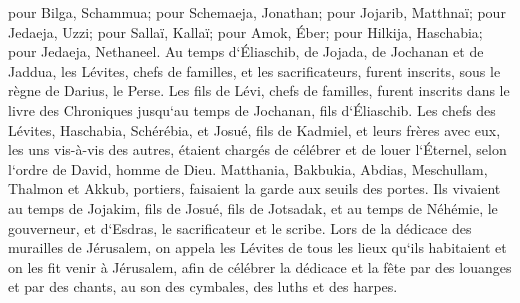 \verse pour Bilga, Schammua; pour Schemaeja, Jonathan; 
\verse pour Jojarib, Matthnaï; pour Jedaeja, Uzzi; 
\verse pour Sallaï, Kallaï; pour Amok, Éber; 
\verse pour Hilkija, Haschabia; pour Jedaeja, Nethaneel. 
\verse Au temps d`Éliaschib, de Jojada, de Jochanan et de Jaddua, les Lévites, chefs de familles, et les sacrificateurs, furent inscrits, sous le règne de Darius, le Perse. 
\verse Les fils de Lévi, chefs de familles, furent inscrits dans le livre des Chroniques jusqu`au temps de Jochanan, fils d`Éliaschib. 
\verse Les chefs des Lévites, Haschabia, Schérébia, et Josué, fils de Kadmiel, et leurs frères avec eux, les uns vis-à-vis des autres, étaient chargés de célébrer et de louer l`Éternel, selon l`ordre de David, homme de Dieu. 
\verse Matthania, Bakbukia, Abdias, Meschullam, Thalmon et Akkub, portiers, faisaient la garde aux seuils des portes. 
\verse Ils vivaient au temps de Jojakim, fils de Josué, fils de Jotsadak, et au temps de Néhémie, le gouverneur, et d`Esdras, le sacrificateur et le scribe. 
\verse Lors de la dédicace des murailles de Jérusalem, on appela les Lévites de tous les lieux qu`ils habitaient et on les fit venir à Jérusalem, afin de célébrer la dédicace et la fête par des louanges et par des chants, au son des cymbales, des luths et des harpes. 
